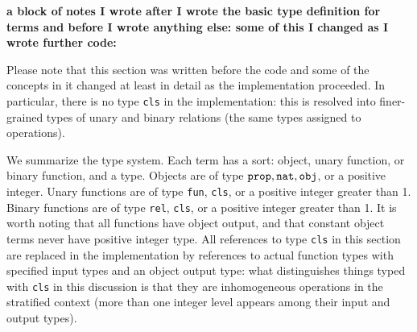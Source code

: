 \documentclass{article}
\begin{document}
{{{\bf a block of notes I wrote after I wrote the basic type definition for terms and before I wrote anything else:  some of this I changed as I wrote further code:}  

Please note that this section was written before the code and some of the concepts in it changed at least in detail as the implementation proceeded.  In particular, there is no
type {\tt cls} in the implementation:  this is resolved into finer-grained types of unary and binary relations (the same types assigned to operations).

We summarize the type system.  Each term has a sort:  object, unary function, or binary function, and a type.  Objects
are of type ${\tt prop}, {\tt nat}, {\tt obj}$, or a positive integer.  Unary functions are of type {\tt fun}, {\tt cls}, or a positive integer greater than 1.   Binary functions are of type {\tt rel}, {\tt cls}, or a positive integer greater than 1.  It is worth  noting that all functions have object output,
and that constant object terms never have positive integer type.  All references to type {\tt cls} in this section are replaced in the implementation
by references to actual function types with specified input types and an object output type:  what distinguishes things typed with {\tt cls} in this discussion is that
they are inhomogeneous operations in the stratified context (more than one integer level appears among their input and output types).

}}
\end{document}
